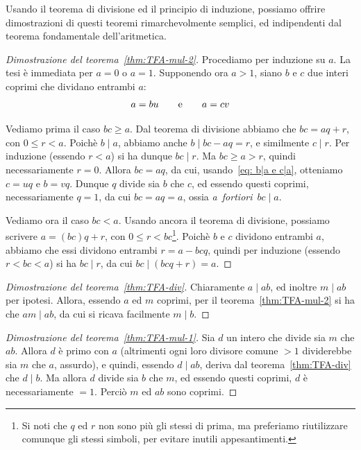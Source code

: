 \documentclass[pdflatex,11pt,a4paper,oneside]{article}
\newcommand{\TFA}{teorema fondamentale dell'aritmetica}
\let\OldEmph\emph
\renewcommand{\emph}[1]{\OldEmph{#1\/}}
\newcommand{\p}[1]{\left({#1}\right)}
\newcommand{\divides}[0]{\mid}
\begin{document}
Usando il teorema di divisione ed il principio di induzione, possiamo
offrire dimostrazioni di questi teoremi rimarchevolmente semplici, ed
indipendenti dal \TFA.
%
\begin{proof}[Dimostrazione del teorema~\eqref{thm:TFA-mul-2}]
%
Procediamo per induzione su $a$.  La tesi \`e immediata per $a = 0$ o
$a = 1$.  Supponendo ora $a > 1$, siano $b$ e $c$ due interi coprimi
che dividano entrambi $a$:%
  \vspace*{-5pt}%
\begin{equation}\label{eq: b|a e c|a}
a = bu \qquad\textrm{e}\qquad a = cv
  \vspace*{-5pt}%
\end{equation}

Vediamo prima il caso $bc \geq a$. Dal teorema di divisione abbiamo che
$bc = aq + r$, con $0 \leq r < a$.  Poich\`e $b \divides a$, abbiamo
anche $b \divides bc - aq = r$, e similmente $c \divides r$.  Per
induzione (essendo $r < a$) si ha dunque $bc \divides r$. Ma $bc \geq
a > r$, quindi necessariamente $r = 0$. Allora $bc = aq$, da cui,
usando~\eqref{eq: b|a e c|a}, otteniamo $c = uq$ e $b = vq$.  Dunque $q$
divide sia $b$ che $c$, ed essendo questi coprimi, necessariamente
$q = 1$, da cui $bc = aq = a$, ossia \emph{a~fortiori}
\,$bc \divides a$.

\smallskip
Vediamo ora il caso $bc < a$. Usando ancora il teorema di divisione,
possiamo scrivere $a = (bc)q + r$, con $0 \leq r < bc$\footnote{Si
noti che $q$ ed $r$ non sono pi\`u gli stessi di prima, ma preferiamo
riutilizzare comunque gli stessi simboli, per evitare inutili
appesantimenti.}. Poich\`e $b$ e $c$ dividono entrambi $a$, abbiamo
che essi dividono entrambi $r = a - bcq$, quindi per induzione
(essendo $r < bc < a$) si ha $bc \divides r$, da cui
$bc \divides \p{bcq + r} = a$.
%
\end{proof}

\begin{proof}[Dimostrazione del teorema~\eqref{thm:TFA-div}]
Chiaramente $a \divides ab$, ed inoltre $m \divides ab$ per ipotesi.
Allora, essendo $a$ ed $m$ coprimi, per il teorema~\eqref{thm:TFA-mul-2}
si ha che $am \divides ab$, da cui si ricava facilmente $m \divides b$.
\end{proof}

\begin{proof}[Dimostrazione del teorema~\eqref{thm:TFA-mul-1}]
Sia $d$ un intero che divide sia $m$ che $ab$.  Allora $d$ \`e primo
con $a$ (altrimenti ogni loro divisore comune $> 1$ dividerebbe sia
$m$ che $a$, assurdo), e quindi, essendo $d \divides ab$, deriva dal
teorema~\eqref{thm:TFA-div} che $d \divides b$.  Ma allora $d$ divide
sia $b$ che $m$, ed essendo questi coprimi, $d$ \`e necessariamente
$= 1$. Perci\`o $m$ ed $ab$ sono coprimi.
\end{proof}
\end{document}
